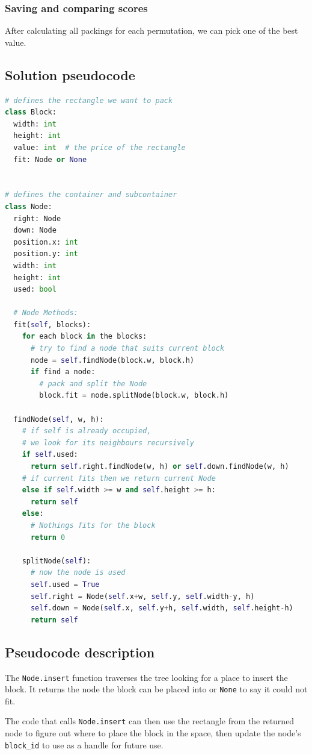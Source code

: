 \subsubsection{Saving and comparing scores}
After calculating all packings for each permutation,
we can pick one of the best value.

\newpage
\subsection{Solution pseudocode}
\begin{lstlisting}[language=Python, caption=Python-style pseudocode]
# defines the rectangle we want to pack
class Block:
  width: int
  height: int
  value: int  # the price of the rectangle
  fit: Node or None


# defines the container and subcontainer
class Node:
  right: Node
  down: Node
  position.x: int
  position.y: int
  width: int
  height: int
  used: bool

  # Node Methods:
  fit(self, blocks):
    for each block in the blocks:
      # try to find a node that suits current block
      node = self.findNode(block.w, block.h) 
      if find a node: 
        # pack and split the Node
        block.fit = node.splitNode(block.w, block.h) 

  findNode(self, w, h):
    # if self is already occupied, 
    # we look for its neighbours recursively
    if self.used: 
      return self.right.findNode(w, h) or self.down.findNode(w, h)
    # if current fits then we return current Node
    else if self.width >= w and self.height >= h: 
      return self
    else:
      # Nothings fits for the block
      return 0 

    splitNode(self):
      # now the node is used
      self.used = True
      self.right = Node(self.x+w, self.y, self.width-y, h)
      self.down = Node(self.x, self.y+h, self.width, self.height-h)
      return self

\end{lstlisting}

\subsection{Pseudocode description}
The \texttt{Node.insert} function traverses the tree looking for a place
to insert the block.
It returns the node the block can be placed into or \texttt{None} to say
it could not fit.

The code that calls \texttt{Node.insert} can then use the rectangle
from the returned node to figure out where to place the block in the space,
then update the node's \texttt{block\_id} to use as a handle for future use.

